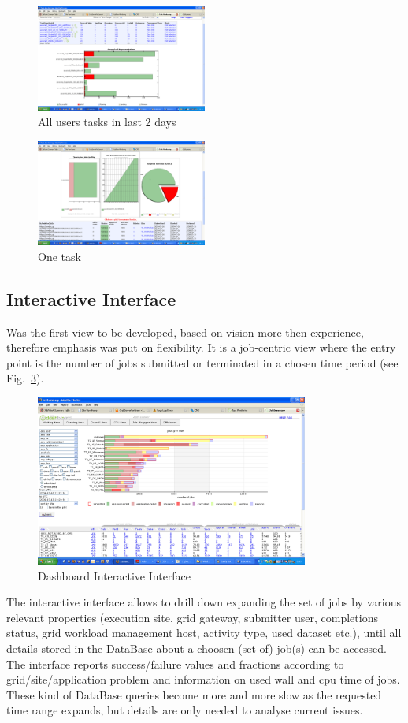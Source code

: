 \begin{figure}
 \includegraphics[width=0.50\textwidth]{figures/TaskMonitor1.png}
\caption{All users tasks in last 2 days}
\label{fig:TaskMonitor1}
\end{figure}
\begin{figure}
 \includegraphics[width=0.50\textwidth]{figures/TaskMonitor2.png}
\caption{One task}
\label{fig:TaskMonitor2}
\end{figure}

\subsection{Interactive Interface}
Was the first view to be developed, based on
vision more then experience, therefore
emphasis was put on flexibility. It is a job-centric view
where the entry point is the number of jobs submitted or
terminated in a chosen time period (see Fig.~\ref{fig:Dashboard}).
\begin{figure}
 \includegraphics[width=0.80\textwidth]{figures/DashboardInteractive.png}
\caption{Dashboard Interactive Interface}
\label{fig:Dashboard}
\end{figure}
The interactive interface
allows to drill down expanding the set of jobs by
various relevant properties (execution site, grid gateway,
submitter user, completions status, grid workload management host,
activity type, used dataset etc.), until all details stored in the DataBase
about a choosen (set of) job(s) can be accessed.
The interface reports success/failure values and fractions
according to grid/site/application problem and information
on used wall and cpu time of jobs.
These kind of DataBase queries become more and more slow as the requested
time range expands, but details are only needed to analyse current issues.


